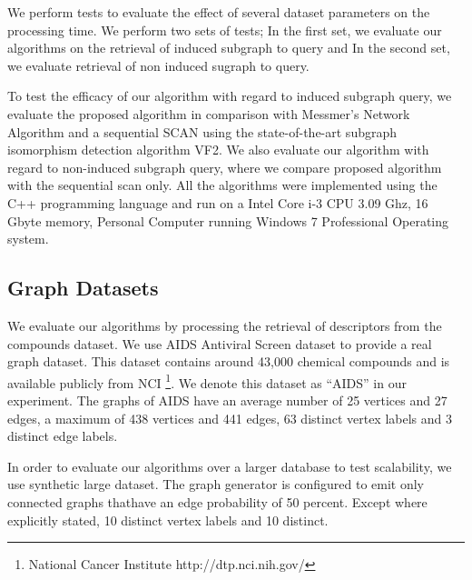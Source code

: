 We perform tests to evaluate the effect of several dataset parameters on the processing time.
We perform two sets of tests; In the first set, we evaluate our algorithms on the retrieval of induced subgraph to query and In the second set, we evaluate retrieval of non induced sugraph to query.

To test the efficacy of our algorithm with regard to induced subgraph query, we evaluate the proposed algorithm in comparison with Messmer's Network Algorithm and a sequential SCAN using the state-of-the-art subgraph isomorphism detection algorithm VF2\cite{cordella2001_vf2}.
We also evaluate our algorithm with regard to non-induced subgraph query, where we compare proposed algorithm with the sequential scan only.
All the algorithms were implemented using the C++ programming language and run on a Intel Core i-3 CPU 3.09 Ghz, 16 Gbyte memory, Personal Computer running Windows 7 Professional Operating system.

\subsection{Graph Datasets}
We evaluate our algorithms by processing the retrieval of descriptors from the compounds dataset.
We use AIDS Antiviral Screen dataset to provide a real graph dataset.
This dataset contains around 43,000 chemical compounds and is available publicly from NCI
\footnote{National Cancer Institute http://dtp.nci.nih.gov/}.
We denote this dataset as ``AIDS'' in our experiment.
The graphs of AIDS have an average number of 25 vertices and 27 edges, a maximum of 438 vertices and 441 edges,
63 distinct vertex labels and 3 distinct edge labels.

In order to evaluate our algorithms over a larger database to test scalability, we use synthetic large dataset. 
The graph generator is configured to emit only connected graphs thathave an edge probability of 50 percent. 
Except where explicitly stated, 10 distinct vertex labels and 10 distinct.

